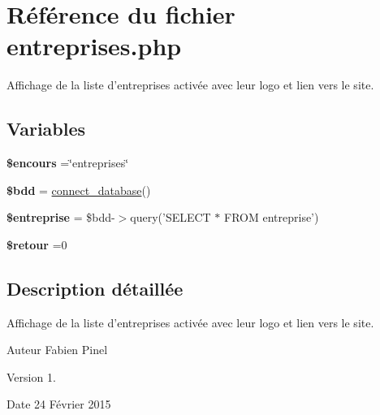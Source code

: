 \hypertarget{entreprises_8php}{\section{Référence du fichier entreprises.\-php}
\label{entreprises_8php}
}


Affichage de la liste d'entreprises activée avec leur logo et lien vers le site.  


\subsection*{Variables}
\begin{DoxyCompactItemize}
\item 
\hypertarget{entreprises_8php_af7b0e56292699e6983c24fbbf70ce08d}{{\bfseries \$encours} =\char`\"{}entreprises\char`\"{}}\label{entreprises_8php_af7b0e56292699e6983c24fbbf70ce08d}

\item 
\hypertarget{entreprises_8php_a94f91e878bce0991e2cd595c5dd79b3f}{{\bfseries \$bdd} = \hyperlink{function_8php_a1f56f7efe8c1222675d8715c259957d5}{connect\-\_\-database}()}\label{entreprises_8php_a94f91e878bce0991e2cd595c5dd79b3f}

\item 
\hypertarget{entreprises_8php_a6d3423f147c69f4f47f014654a57fc93}{{\bfseries \$entreprise} = \$bdd-\/$>$query('S\-E\-L\-E\-C\-T $\ast$ F\-R\-O\-M entreprise')}\label{entreprises_8php_a6d3423f147c69f4f47f014654a57fc93}

\item 
\hypertarget{entreprises_8php_a864921c956cf199fe5e99e92ba15309b}{{\bfseries \$retour} =0}\label{entreprises_8php_a864921c956cf199fe5e99e92ba15309b}

\end{DoxyCompactItemize}


\subsection{Description détaillée}
Affichage de la liste d'entreprises activée avec leur logo et lien vers le site. \begin{DoxyAuthor}{Auteur}
Fabien Pinel 
\end{DoxyAuthor}
\begin{DoxyVersion}{Version}
1. 
\end{DoxyVersion}
\begin{DoxyDate}{Date}
24 Février 2015 
\end{DoxyDate}
